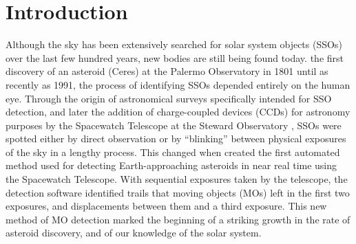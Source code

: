 \documentclass[twocolumn]{aastex62}
\begin{document}
\section{Introduction} \label{sec:intro}

Although the sky has been extensively searched for solar system objects (SSOs) over the last few hundred years, new bodies are still being found today.   the first discovery of an asteroid (Ceres) at the Palermo Observatory in 1801 \citep{cunningham09} until as recently as 1991, the process of identifying  \eonesout{(}SSOs\eonesout{)} depended entirely on the human eye.  Through the origin of astronomical surveys specifically intended for SSO detection, and later the addition of charge-coupled devices (CCDs) for astronomy purposes by the Spacewatch Telescope at the Steward Observatory \citep{gehrels91}, SSOs were spotted either by direct observation or by ``blinking'' between physical exposures of the sky in a lengthy process. This changed when \cite{Rabinowitz91} created the first automated method used for detecting Earth-approaching asteroids in near real time using the Spacewatch Telescope.  With sequential exposures taken by the telescope, the detection software identified trails that moving objects (MOs) left in the first two exposures, and displacements between them and a third exposure.  This new method of MO detection marked the beginning of a striking growth in the rate of asteroid discovery, and of our knowledge of the solar system.  
\end{document}

